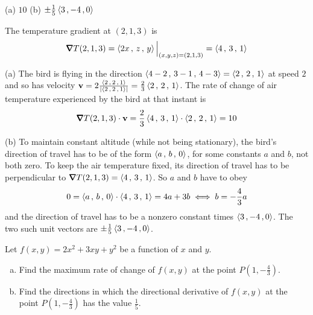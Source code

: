 \begin{answer}
(a) $10$\qquad
(b) $\pm \frac{1}{5}\left< 3\,,-4\,,0\right>$
\end{answer}

\begin{solution}
The temperature gradient at $(2,1,3)$ is
\begin{align*}
\vnabla T(2,1,3) = \llt 2x\,,\,z\,,\,y \rgt\Big|_{(x,y,z)=(2,1,3)}
                 = \llt 4\,,\,3\,,\,1 \rgt
\end{align*}

(a) The bird is flying in the direction $\left< 4-2\,,\,3-1\,,\,4-3 \right>
=\left< 2\,,\,2\,,\,1\right>$ at speed $2$ and so has velocity
$
\mathbf{v}=2\frac{\left< 2\,,\,2\,,\,1\right>}{|\left< 2\,,\,2\,,\,1\right>|}
=\frac{2}{3} \left< 2\,,\,2\,,\,1\right>
$.
The rate of change of air temperature experienced by the bird at that 
instant is
\begin{align*}
\vnabla T(2,1,3) \cdot\vv
=\frac{2}{3} \llt 4\,,\,3\,,\,1 \rgt \cdot \llt 2\,,\,2\,,\,1\rgt
= 10
\end{align*}

(b) To maintain constant altitude (while not being stationary), 
the bird's direction of travel has to be 
of the form $\left< a\,,\,b\,,\,0\right>$, for some constants $a$ and $b$,
not both zero. To keep the air temperature fixed, its direction of travel
has to be perpendicular to $\vnabla T(2,1,3)= \llt 4\,,\,3\,,\,1 \rgt$.
So $a$ and $b$ have to obey
\begin{align*}
0 = \left< a\,,\,b\,,\,0\right> \cdot \left< 4\,,\,3\,,\,1 \right>
  = 4a+3b
\iff b=-\frac{4}{3}a
\end{align*}
and the direction of travel has to be a nonzero constant times 
$\left< 3\,,-4\,,0\right>$. The two such unit vectors are 
$\pm \frac{1}{5}\left< 3\,,-4\,,0\right>$.
\end{solution}

\begin{question}[M200 2009A] %
Let $f(x,y) = 2x^2 + 3xy + y^2$ be a function of $x$ and $y$.

\begin{enumerate}[(a)]
\item
Find the maximum rate of change of $f(x,y)$ at the point 
$P\left(1, -\frac{4}{3}\right)$.


\item
Find the directions in which the directional derivative of $f(x,y)$ 
at the point $P\left(1, -\frac{4}{3}\right)$ has the value $\frac{1}{5}$.
\end{enumerate}

\end{question}

